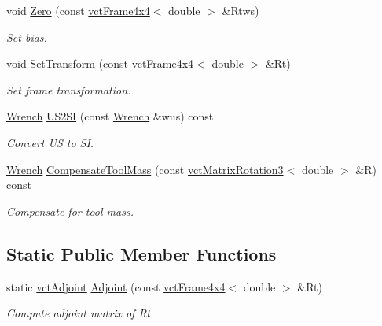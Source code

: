 \begin{DoxyCompactItemize}
void \hyperlink{classosa_j_r3_force_sensor_aaaca311243f3906a23acfa1422981a71}{Zero} (const \hyperlink{classvct_frame4x4}{vct\-Frame4x4}$<$ double $>$ \&Rtws)
\begin{DoxyCompactList}\small\item\em Set bias. \end{DoxyCompactList}\item 
void \hyperlink{classosa_j_r3_force_sensor_a91ce3f4e0c5b2a8293abf85a7e75afbd}{Set\-Transform} (const \hyperlink{classvct_frame4x4}{vct\-Frame4x4}$<$ double $>$ \&Rt)
\begin{DoxyCompactList}\small\item\em Set frame transformation. \end{DoxyCompactList}\item 
\hyperlink{classosa_j_r3_force_sensor_afcfc2ba175b2e7ef9f86c6394c8966d2}{Wrench} \hyperlink{classosa_j_r3_force_sensor_aa76b7cf966facceaa220f46bd7c71265}{U\-S2\-S\-I} (const \hyperlink{classosa_j_r3_force_sensor_afcfc2ba175b2e7ef9f86c6394c8966d2}{Wrench} \&wus) const 
\begin{DoxyCompactList}\small\item\em Convert U\-S to S\-I. \end{DoxyCompactList}\item 
\hyperlink{classosa_j_r3_force_sensor_afcfc2ba175b2e7ef9f86c6394c8966d2}{Wrench} \hyperlink{classosa_j_r3_force_sensor_a25e6c9de5e0e7c948dea2bc0d2a0231e}{Compensate\-Tool\-Mass} (const \hyperlink{classvct_matrix_rotation3}{vct\-Matrix\-Rotation3}$<$ double $>$ \&R) const 
\begin{DoxyCompactList}\small\item\em Compensate for tool mass. \end{DoxyCompactList}\end{DoxyCompactItemize}
\subsection*{Static Public Member Functions}
\begin{DoxyCompactItemize}
\item 
static \hyperlink{classosa_j_r3_force_sensor_af769666ad69e4db31c2891ddf67d2abd}{vct\-Adjoint} \hyperlink{classosa_j_r3_force_sensor_ab8639c1152c6002572eb8339c045982d}{Adjoint} (const \hyperlink{classvct_frame4x4}{vct\-Frame4x4}$<$ double $>$ \&Rt)
\begin{DoxyCompactList}\small\item\em Compute adjoint matrix of Rt. \end{DoxyCompactList}\end{DoxyCompactItemize}


